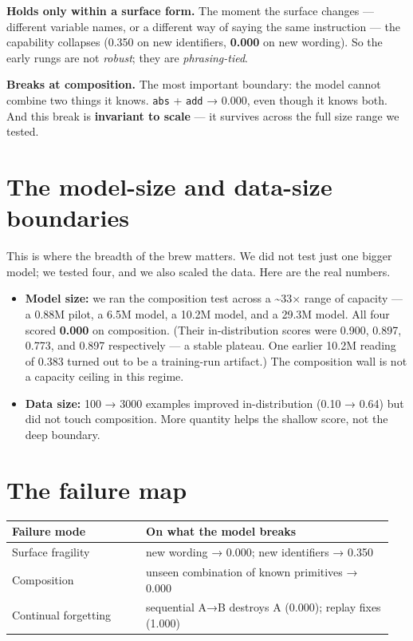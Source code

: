 \textbf{Holds only within a surface form.} The moment the surface
changes --- different variable names, or a different way of saying the
same instruction --- the capability collapses (0.350 on new identifiers,
\textbf{0.000} on new wording). So the early rungs are not
\emph{robust}; they are \emph{phrasing-tied}.

\textbf{Breaks at composition.} The most important boundary: the model
cannot combine two things it knows. \texttt{abs} + \texttt{add} → 0.000,
even though it knows both. And this break is \textbf{invariant to scale}
--- it survives across the full size range we tested.

\section{The model-size and data-size
boundaries}\label{the-model-size-and-data-size-boundaries}

This is where the breadth of the brew matters. We did not test just one
bigger model; we tested four, and we also scaled the data. Here are the
real numbers.

\begin{itemize}
\tightlist
\item
  \textbf{Model size:} we ran the composition test across a
  \textasciitilde33× range of capacity --- a 0.88M pilot, a 6.5M model,
  a 10.2M model, and a 29.3M model. All four scored \textbf{0.000} on
  composition. (Their in-distribution scores were 0.900, 0.897, 0.773,
  and 0.897 respectively --- a stable plateau. One earlier 10.2M reading
  of 0.383 turned out to be a training-run artifact.) The composition
  wall is not a capacity ceiling in this regime.
\item
  \textbf{Data size:} 100 → 3000 examples improved in-distribution (0.10
  → 0.64) but did not touch composition. More quantity helps the shallow
  score, not the deep boundary.
\end{itemize}

\section{The failure map}\label{the-failure-map}

\begin{longtable}[]{@{}
  >{\raggedright\arraybackslash}p{0.3325\linewidth}
>{\raggedright\arraybackslash}p{0.6175\linewidth}
@{}}
\toprule\noalign{}
\begin{minipage}[b]{\linewidth}\raggedright
Failure mode
\end{minipage} & \begin{minipage}[b]{\linewidth}\raggedright
On what the model breaks
\end{minipage} \\
\midrule\noalign{}
\endhead
\bottomrule\noalign{}
\endlastfoot
Surface fragility & new wording → 0.000; new identifiers → 0.350 \\
Composition & unseen combination of known primitives → 0.000 \\
Continual forgetting & sequential A→B destroys A (0.000); replay fixes
(1.000) \\
\end{longtable}

